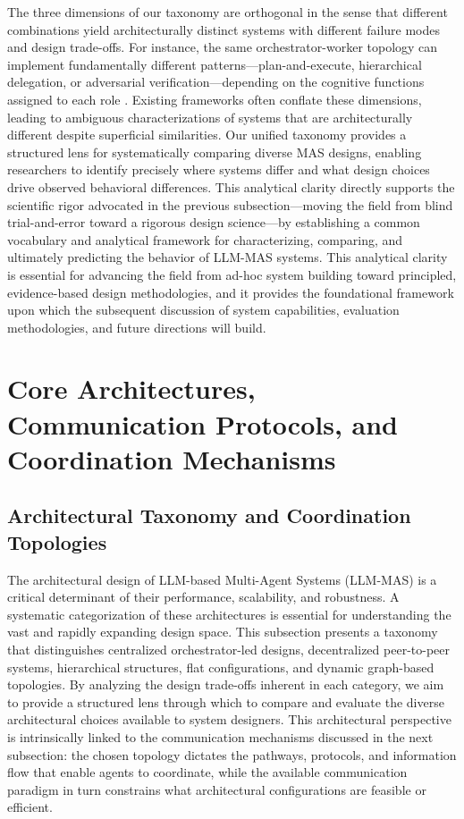 \documentclass[11pt]{article}
\begin{document}
The three dimensions of our taxonomy are orthogonal in the sense that different combinations yield architecturally distinct systems with different failure modes and design trade-offs. For instance, the same orchestrator-worker topology can implement fundamentally different patterns---plan-and-execute, hierarchical delegation, or adversarial verification---depending on the cognitive functions assigned to each role \cite{ref50}. Existing frameworks often conflate these dimensions, leading to ambiguous characterizations of systems that are architecturally different despite superficial similarities. Our unified taxonomy provides a structured lens for systematically comparing diverse MAS designs, enabling researchers to identify precisely where systems differ and what design choices drive observed behavioral differences. This analytical clarity directly supports the scientific rigor advocated in the previous subsection---moving the field from blind trial-and-error toward a rigorous design science---by establishing a common vocabulary and analytical framework for characterizing, comparing, and ultimately predicting the behavior of LLM-MAS systems. This analytical clarity is essential for advancing the field from ad-hoc system building toward principled, evidence-based design methodologies, and it provides the foundational framework upon which the subsequent discussion of system capabilities, evaluation methodologies, and future directions will build.

\section{Core Architectures, Communication Protocols, and Coordination Mechanisms}

\subsection{Architectural Taxonomy and Coordination Topologies}

The architectural design of LLM-based Multi-Agent Systems (LLM-MAS) is a critical determinant of their performance, scalability, and robustness. A systematic categorization of these architectures is essential for understanding the vast and rapidly expanding design space. This subsection presents a taxonomy that distinguishes centralized orchestrator-led designs, decentralized peer-to-peer systems, hierarchical structures, flat configurations, and dynamic graph-based topologies. By analyzing the design trade-offs inherent in each category, we aim to provide a structured lens through which to compare and evaluate the diverse architectural choices available to system designers. This architectural perspective is intrinsically linked to the communication mechanisms discussed in the next subsection: the chosen topology dictates the pathways, protocols, and information flow that enable agents to coordinate, while the available communication paradigm in turn constrains what architectural configurations are feasible or efficient.
\end{document}
